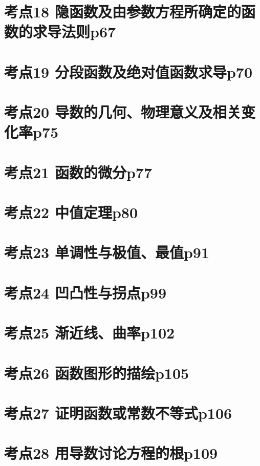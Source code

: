 \section{考点18 隐函数及由参数方程所确定的函数的求导法则p67}

\section{考点19 分段函数及绝对值函数求导p70}

\section{考点20 导数的几何、物理意义及相关变化率p75}

\section{考点21 函数的微分p77}

\section{考点22 中值定理p80}

\section{考点23 单调性与极值、最值p91}

\section{考点24 凹凸性与拐点p99}

\section{考点25 渐近线、曲率p102}

\section{考点26 函数图形的描绘p105}

\section{考点27 证明函数或常数不等式p106}

\section{考点28 用导数讨论方程的根p109}

